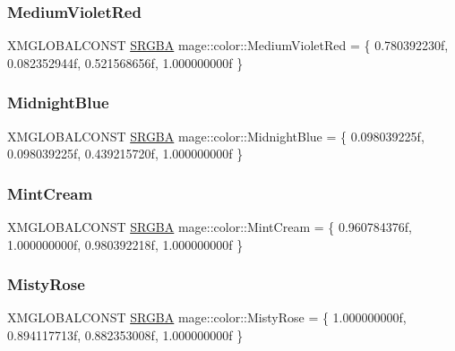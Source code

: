 \subsubsection{\texorpdfstring{Medium\+Violet\+Red}{MediumVioletRed}}
{\footnotesize\ttfamily X\+M\+G\+L\+O\+B\+A\+L\+C\+O\+N\+ST \hyperlink{structmage_1_1_s_r_g_b_a}{S\+R\+G\+BA} mage\+::color\+::\+Medium\+Violet\+Red = \{ 0.\+780392230f, 0.\+082352944f, 0.\+521568656f, 1.\+000000000f \}}

\hypertarget{namespacemage_1_1color_ab3679ab1975558f6924fcf33e3790e48}{}\label{namespacemage_1_1color_ab3679ab1975558f6924fcf33e3790e48} 
\subsubsection{\texorpdfstring{Midnight\+Blue}{MidnightBlue}}
{\footnotesize\ttfamily X\+M\+G\+L\+O\+B\+A\+L\+C\+O\+N\+ST \hyperlink{structmage_1_1_s_r_g_b_a}{S\+R\+G\+BA} mage\+::color\+::\+Midnight\+Blue = \{ 0.\+098039225f, 0.\+098039225f, 0.\+439215720f, 1.\+000000000f \}}

\hypertarget{namespacemage_1_1color_a9cd76a72cfc51cfbf852f77fe2811b51}{}\label{namespacemage_1_1color_a9cd76a72cfc51cfbf852f77fe2811b51} 
\subsubsection{\texorpdfstring{Mint\+Cream}{MintCream}}
{\footnotesize\ttfamily X\+M\+G\+L\+O\+B\+A\+L\+C\+O\+N\+ST \hyperlink{structmage_1_1_s_r_g_b_a}{S\+R\+G\+BA} mage\+::color\+::\+Mint\+Cream = \{ 0.\+960784376f, 1.\+000000000f, 0.\+980392218f, 1.\+000000000f \}}

\hypertarget{namespacemage_1_1color_a6ff7a63a918f5864b0b8e2b3a104ae2c}{}\label{namespacemage_1_1color_a6ff7a63a918f5864b0b8e2b3a104ae2c} 
\subsubsection{\texorpdfstring{Misty\+Rose}{MistyRose}}
{\footnotesize\ttfamily X\+M\+G\+L\+O\+B\+A\+L\+C\+O\+N\+ST \hyperlink{structmage_1_1_s_r_g_b_a}{S\+R\+G\+BA} mage\+::color\+::\+Misty\+Rose = \{ 1.\+000000000f, 0.\+894117713f, 0.\+882353008f, 1.\+000000000f \}}

